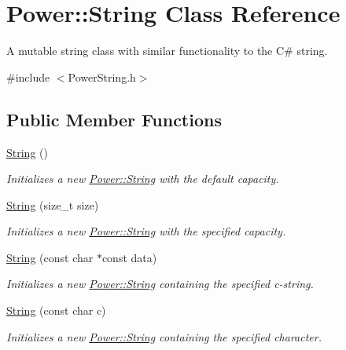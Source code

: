 \hypertarget{class_power_1_1_string}{}\section{Power\+:\+:String Class Reference}
\label{class_power_1_1_string}


A mutable string class with similar functionality to the C\# string.  




{\ttfamily \#include $<$Power\+String.\+h$>$}

\subsection*{Public Member Functions}
\begin{DoxyCompactItemize}
\item 
\hyperlink{class_power_1_1_string_a3ae78cdde9e4e81b420277b5581fee8a}{String} ()
\begin{DoxyCompactList}\small\item\em Initializes a new \hyperlink{class_power_1_1_string}{Power\+::\+String} with the default capacity. \end{DoxyCompactList}\item 
\hyperlink{class_power_1_1_string_a9384235fbbc6956c166abb265e60db11}{String} (size\+\_\+t size)
\begin{DoxyCompactList}\small\item\em Initializes a new \hyperlink{class_power_1_1_string}{Power\+::\+String} with the specified capacity. \end{DoxyCompactList}\item 
\hyperlink{class_power_1_1_string_aec63a74130e5abc89a1556115942a5e1}{String} (const char $\ast$const data)
\begin{DoxyCompactList}\small\item\em Initializes a new \hyperlink{class_power_1_1_string}{Power\+::\+String} containing the specified c-\/string. \end{DoxyCompactList}\item 
\hyperlink{class_power_1_1_string_ad14954dc3dfbdee2196a5298fe176632}{String} (const char c)
\begin{DoxyCompactList}\small\item\em Initializes a new \hyperlink{class_power_1_1_string}{Power\+::\+String} containing the specified character. \end{DoxyCompactList}\item 

\end{DoxyCompactItemize}

